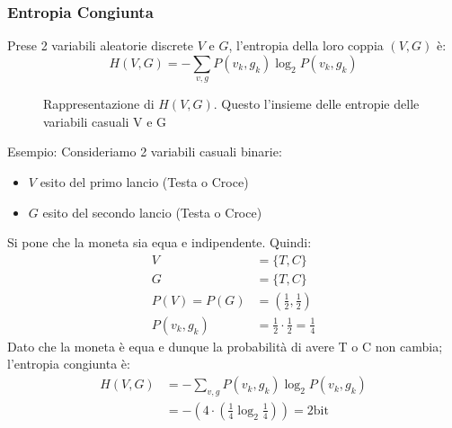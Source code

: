 \subsubsection{Entropia Congiunta}
Prese 2 variabili aleatorie discrete $V$ e $G$, l'entropia della loro coppia $(V,G)$ è:
\[
H(V,G)=-\sum_{v,g}P(v_k,g_k)\log_2P(v_k,g_k)
\]
\usetikzlibrary{shapes,backgrounds}
\def\firstcircle{(0,0) circle (2.5cm)}
\def\secondcircle{(2,0) circle (2.5cm)}
\def\thirdcircle{(1,0)}
\begin{figure}[htbp]
    \caption{Rappresentazione di $H(V,G)$. Questo l'insieme delle entropie delle variabili casuali V e G}
\end{figure}
Esempio: Consideriamo 2 variabili casuali binarie:
\begin{itemize}
    \item $V$ esito del primo lancio (Testa o Croce)
    \item $G$ esito del secondo lancio (Testa o Croce)
\end{itemize}
Si pone che la moneta sia equa e indipendente.
Quindi:
\begin{align}
    V&=\{T,C\}\\
    G&=\{T,C\}\\
    P(V)=P(G)&=\left(\frac{1}{2},\frac{1}{2}\right)\\
    P(v_k,g_k)&=\frac{1}{2}\cdot\frac{1}{2}=\frac{1}{4}
\end{align}
Dato che la moneta è equa e dunque la probabilità di avere T o C non cambia; l'entropia congiunta è:
\begin{align}
    H(V,G)&=-\sum_{v,g}P(v_k,g_k)\log_2P(v_k,g_k)\\
    &=-\left( 4\cdot\left( \frac{1}{4}\log_2\frac{1}{4}\right)\right)=2\text{bit}
\end{align}
